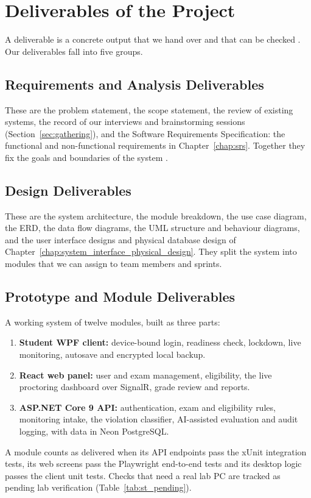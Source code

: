 \section{Deliverables of the Project}

A deliverable is a concrete output that we hand over and that can be checked \cite{del1}. Our deliverables fall into five groups.

\subsection{Requirements and Analysis Deliverables}
These are the problem statement, the scope statement, the review of existing systems, the record of our interviews and brainstorming sessions (Section~\ref{sec:gathering}), and the Software Requirements Specification: the functional and non-functional requirements in Chapter~\ref{chap:srs}. Together they fix the goals and boundaries of the system \cite{srs1}.

\subsection{Design Deliverables}
These are the system architecture, the module breakdown, the use case diagram, the ERD, the data flow diagrams, the UML structure and behaviour diagrams, and the user interface designs and physical database design of Chapter~\ref{chap:system_interface_physical_design}. They split the system into modules that we can assign to team members and sprints.

\subsection{Prototype and Module Deliverables}
A working system of twelve modules, built as three parts:
\begin{enumerate}
    \item \textbf{Student WPF client:} device-bound login, readiness check, lockdown, live monitoring, autosave and encrypted local backup.
    \item \textbf{React web panel:} user and exam management, eligibility, the live proctoring dashboard over SignalR, grade review and reports.
    \item \textbf{ASP.NET Core 9 API:} authentication, exam and eligibility rules, monitoring intake, the violation classifier, AI-assisted evaluation and audit logging, with data in Neon PostgreSQL.
\end{enumerate}
A module counts as delivered when its API endpoints pass the xUnit integration tests, its web screens pass the Playwright end-to-end tests and its desktop logic passes the client unit tests. Checks that need a real lab PC are tracked as pending lab verification (Table~\ref{tab:st_pending}).

